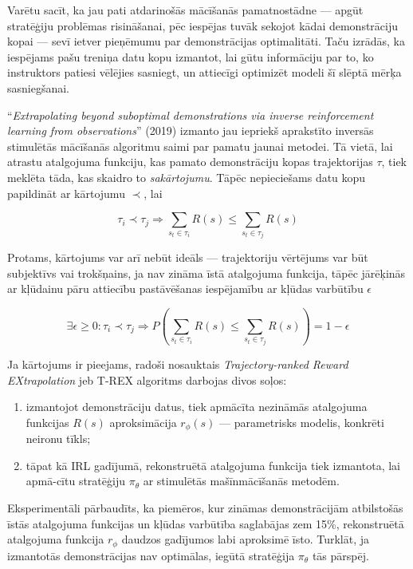 \documentclass[12pt, a4paper]{article}
\numberwithin{equation}{section} %
\begin{document}
Varētu sacīt, ka jau pati atdarinošās mācīšanās pamatnostādne --- apgūt stratēģiju problēmas risināšanai, pēc iespējas tuvāk sekojot kādai demonstrāciju kopai --- sevī ietver pieņēmumu par demonstrācijas optimalitāti. Taču izrādās, ka iespējams pašu treniņa datu kopu izmantot, lai gūtu informāciju par to, ko instruktors patiesi vēlējies sasniegt, un attiecīgi optimizēt modeli šī slēptā mērķa sasniegšanai.

``\textit{Extrapolating beyond suboptimal demonstrations via inverse reinforcement learning from observations}'' \cite{brown2019extrapolating} (2019) izmanto jau iepriekš aprakstīto inversās stimulētās mācīšanās algoritmu saimi par pamatu jaunai metodei. Tā vietā, lai atrastu atalgojuma funkciju, kas pamato demonstrāciju kopas trajektorijas $\tau$, tiek meklēta tāda, kas skaidro to \textit{sakārtojumu}. Tāpēc nepieciešams datu kopu papildināt ar kārtojumu $\prec$, lai

\begin{equation}
    \tau_i \prec \tau_j \Rightarrow \sum_{s_t \in \tau_i}R(s) \leq \sum_{s_t \in \tau_j}R(s)
\end{equation}

Protams, kārtojums var arī nebūt ideāls --- trajektoriju vērtējums var būt subjektīvs vai trokšņains, ja nav zināma īstā atalgojuma funkcija, tāpēc jārēķinās ar kļūdainu pāru attiecību pastāvēšanas iespējamību ar kļūdas varbūtību $\epsilon$

\begin{equation}
    \exists \epsilon \geq 0 : \tau_i \prec \tau_j \Rightarrow P\left(\sum_{s_t \in \tau_i}R(s) \leq \sum_{s_t \in \tau_j}R(s)\right) = 1 - \epsilon
\end{equation}

Ja kārtojums ir pieejams, radoši nosauktais \textit{Trajectory-ranked Reward EXtrapolation} jeb T-REX algoritms darbojas divos soļos:

\begin{enumerate}
    \item izmantojot demonstrāciju datus, tiek apmācīta nezināmās atalgojuma funkcijas $R(s)$ aproksimācija $r_{\phi}(s)$ --- parametrisks modelis, konkrēti neironu tīkls;
    \item tāpat kā IRL gadījumā, rekonstruētā atalgojuma funkcija tiek izmantota, lai apmā-cītu stratēģiju $\pi_{\theta}$ ar stimulētās mašīnmācīšanās metodēm.
\end{enumerate}

Eksperimentāli pārbaudīts, ka piemēros, kur zināmas demonstrācijām atbilstošās īstās atalgojuma funkcijas un kļūdas varbūtība saglabājas zem 15\%, rekonstruētā atalgojuma funkcija $r_{\phi}$ daudzos gadījumos labi aproksimē īsto. Turklāt, ja izmantotās demonstrācijas nav optimālas, iegūtā stratēģija $\pi_{\theta}$ tās pārspēj.
\end{document}
